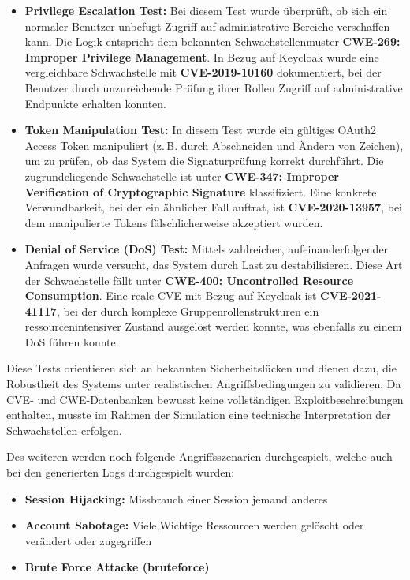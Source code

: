 \documentclass[a4paper,12pt]{article}
\begin{document}
	\begin{itemize}
		\item \textbf{Privilege Escalation Test:}
		Bei diesem Test wurde überprüft, ob sich ein normaler Benutzer unbefugt Zugriff auf administrative Bereiche verschaffen kann. Die Logik entspricht dem bekannten Schwachstellenmuster \textbf{CWE-269: Improper Privilege Management}. In Bezug auf Keycloak wurde eine vergleichbare Schwachstelle mit \textbf{CVE-2019-10160} dokumentiert, bei der Benutzer durch unzureichende Prüfung ihrer Rollen Zugriff auf administrative Endpunkte erhalten konnten.
		\item \textbf{Token Manipulation Test:}  
		In diesem Test wurde ein gültiges OAuth2 Access Token manipuliert (z.\,B. durch Abschneiden und Ändern von Zeichen), um zu prüfen, ob das System die Signaturprüfung korrekt durchführt. Die zugrundeliegende Schwachstelle ist unter \textbf{CWE-347: Improper Verification of Cryptographic Signature} klassifiziert. Eine konkrete Verwundbarkeit, bei der ein ähnlicher Fall auftrat, ist \textbf{CVE-2020-13957}, bei dem manipulierte Tokens fälschlicherweise akzeptiert wurden.
		\item \textbf{Denial of Service (DoS) Test:}  
		Mittels zahlreicher, aufeinanderfolgender Anfragen wurde versucht, das System durch Last zu destabilisieren. Diese Art der Schwachstelle fällt unter \textbf{CWE-400: Uncontrolled Resource Consumption}. Eine reale CVE mit Bezug auf Keycloak ist \textbf{CVE-2021-41117}, bei der durch komplexe Gruppenrollenstrukturen ein ressourcenintensiver Zustand ausgelöst werden konnte, was ebenfalls zu einem DoS führen konnte.
	\end{itemize}
	
	Diese Tests orientieren sich an bekannten Sicherheitslücken und dienen dazu, die Robustheit des Systems unter realistischen Angriffsbedingungen zu validieren. Da CVE- und CWE-Datenbanken bewusst keine vollständigen Exploitbeschreibungen enthalten, musste im Rahmen der Simulation eine technische Interpretation der Schwachstellen erfolgen.
	
	Des weiteren werden noch folgende Angriffsszenarien durchgespielt, welche auch bei den generierten Logs durchgespielt wurden:
	
	\begin{itemize}
		\item \textbf{Session Hijacking:}  Missbrauch einer Session jemand anderes
		\item \textbf{Account Sabotage:}  Viele,Wichtige Ressourcen werden gelöscht oder verändert oder zugegriffen
		\item \textbf{Brute Force Attacke (\gls{bruteforce})} 
	\end{itemize}
	
\end{document}
